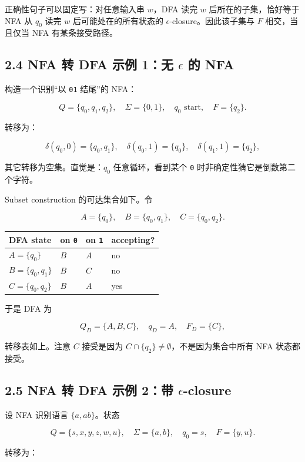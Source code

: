 ﻿\documentclass[UTF8,11pt]{ctexart}
\begin{document}
正确性句子可以固定写：对任意输入串 \(w\)，DFA 读完 \(w\) 后所在的子集，恰好等于 NFA 从 \(q_0\) 读完 \(w\) 后可能处在的所有状态的 \(\epsilon\)-closure。因此该子集与 \(F\) 相交，当且仅当 NFA 有某条接受路径。


\subsection{2.4 NFA 转 DFA 示例 1：无 \(\epsilon\) 的 NFA}


构造一个识别“以 \texttt{01} 结尾”的 NFA：

\[
Q=\{q_0,q_1,q_2\},\quad \Sigma=\{0,1\},\quad q_0\text{ start},\quad F=\{q_2\}.
\]

转移为：

\[
\delta(q_0,0)=\{q_0,q_1\},\quad \delta(q_0,1)=\{q_0\},\quad
\delta(q_1,1)=\{q_2\},
\]

其它转移为空集。直觉是：\(q_0\) 任意循环，看到某个 \texttt{0} 时非确定性猜它是倒数第二个字符。


Subset construction 的可达集合如下。令

\[
A=\{q_0\},\quad B=\{q_0,q_1\},\quad C=\{q_0,q_2\}.
\]


\begin{longtable}{|p{}|p{}|p{}|p{}|}
\hline
\textbf{DFA state} & \textbf{on \texttt{0}} & \textbf{on \texttt{1}} & \textbf{accepting?} \\
\hline
\(A=\{q_0\}\) & \(B\) & \(A\) & no \\
\hline
\(B=\{q_0,q_1\}\) & \(B\) & \(C\) & no \\
\hline
\(C=\{q_0,q_2\}\) & \(B\) & \(A\) & yes \\
\hline
\end{longtable}


于是 DFA 为

\[
Q_D=\{A,B,C\},\quad q_D=A,\quad F_D=\{C\},
\]

转移表如上。注意 \(C\) 接受是因为 \(C\cap\{q_2\}\neq\emptyset\)，不是因为集合中所有 NFA 状态都接受。


\subsection{2.5 NFA 转 DFA 示例 2：带 \(\epsilon\)-closure}


设 NFA 识别语言 \(\{a,ab\}\)。状态

\[
Q=\{s,x,y,z,w,u\},\quad \Sigma=\{a,b\},\quad q_0=s,\quad F=\{y,u\}.
\]

转移为：
\end{document}
